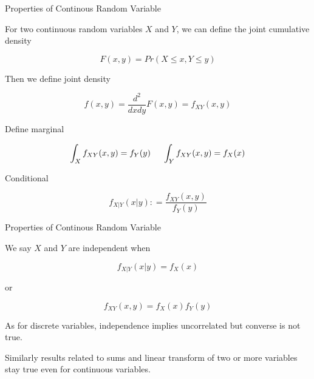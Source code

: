 \documentclass{beamer}\usepackage[]{graphicx}\usepackage[]{color}
\begin{document}
\begin{frame}{Properties of Continous Random Variable}

For two continuous random variables $X$ and $Y$, we can define the joint cumulative density

$$ F(x,y) = Pr (X \leq x, Y \leq y) $$

Then we define joint density

$$ f(x,y) = \frac{d^2}{dxdy} F(x,y) = f_{XY}(x,y) $$

Define marginal

$$ \int_{X} f_{XY}(x,y) = f_{Y}(y) \hspace{0.5 cm} \int_{Y} f_{XY}(x,y) = f_{X}(x) $$

Conditional

$$ f_{X|Y}(x|y) : = \frac{f_{XY}(x,y)}{f_{Y}(y)}  $$

\end{frame}

\begin{frame}{Properties of Continous Random Variable}

We say $X$ and $Y$ are independent when

$$ f_{X|Y}(x|y) = f_{X}(x)  $$

or

$$ f_{XY}(x,y)=f_{X}(x)f_{Y}(y) $$

As for discrete variables, independence implies uncorrelated but converse
is not true.

Similarly results related to sums and linear transform of two or more variables
stay true even for continuous variables.

\end{frame}
\end{document}
